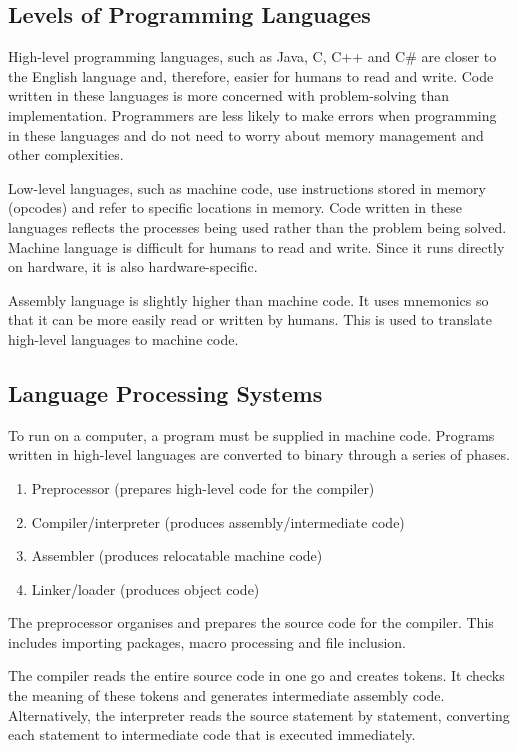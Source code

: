 \subsection{Levels of Programming Languages}

High-level programming languages, such as Java, C, C++ and C\# are closer to the English language and, therefore, easier for humans to read and write.
Code written in these languages is more concerned with problem-solving than implementation.
Programmers are less likely to make errors when programming in these languages and do not need to worry about memory management and other complexities.

Low-level languages, such as machine code, use instructions stored in memory (opcodes) and refer to specific locations in memory.
Code written in these languages reflects the processes being used rather than the problem being solved.
Machine language is difficult for humans to read and write.
Since it runs directly on hardware, it is also hardware-specific.

Assembly language is slightly higher than machine code.
It uses mnemonics so that it can be more easily read or written by humans.
This is used to translate high-level languages to machine code.

\subsection{Language Processing Systems}

To run on a computer, a program must be supplied in machine code.
Programs written in high-level languages are converted to binary through a series of phases.

\begin{enumerate}
  \item Preprocessor (prepares high-level code for the compiler)
  \item Compiler/interpreter (produces assembly/intermediate code)
  \item Assembler (produces relocatable machine code)
  \item Linker/loader (produces object code)
\end{enumerate}

The preprocessor organises and prepares the source code for the compiler.
This includes importing packages, macro processing and file inclusion.

The compiler reads the entire source code in one go and creates tokens.
It checks the meaning of these tokens and generates intermediate assembly code.
Alternatively, the interpreter reads the source statement by statement, converting each statement to intermediate code that is executed immediately.

